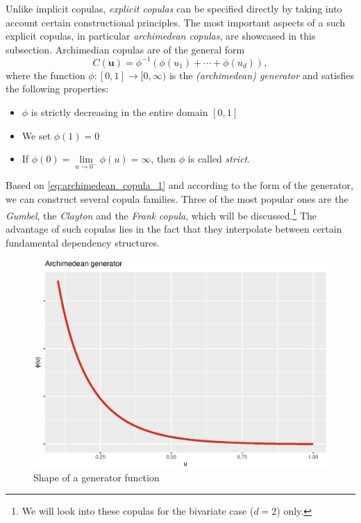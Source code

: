 
Unlike implicit copulas, \textit{explicit copulas} can be specified directly by taking into account certain constructional principles. The most important aspects of a such explicit copulas, in particular \textit{archimedean copulas}, are showcased in this subsection. Archimedian copulas are of the general form
\begin{equation}C(\boldsymbol{u})=\phi^{-1}\left(\phi\left(u_{1}\right)+\cdots+\phi\left(u_{d}\right)\right),
\label{eq:archimedean_copula_1}
\end{equation}
where the function $\phi:[0,1] \rightarrow [0, \infty)$ is the \textit{(archimedean) generator} and satisfies the following properties:
\begin{itemize}
\item $\phi$ is strictly decreasing in the entire domain $[0, 1]$
\item We set $\phi (1) = 0$
\item If  $\phi(0)=\lim \limits _{u \rightarrow 0^{-}} \phi(u)= \infty$, then $\phi$ is called \textit{strict}.
\end{itemize}




Based on \autoref{eq:archimedean_copula_1} and according to the form of the generator, we can construct several copula families. Three of the most popular ones are the \textit{Gumbel}, the \textit{Clayton} and the \textit{Frank} \textit{copula}, which will be discussed.\footnote{We will look into these copulas for the bivariate case ($d=2$) only.} The advantage of such copulas lies in the fact that they interpolate between certain fundamental dependency structures.\\

\begin{figure}[H]
\centering
  \includegraphics[width=.5\linewidth]{figures/archimedean_generator.eps}
  \caption{Shape of a generator function}
  \label{fig:archimedean_generator}
\end{figure}

